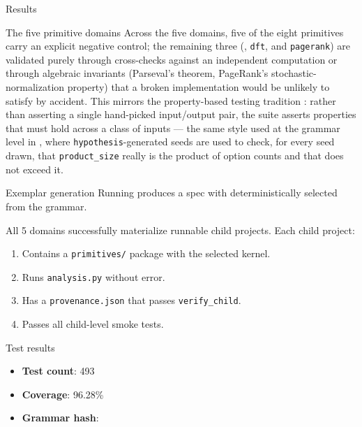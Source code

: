 \documentclass[
  ignorenonframetext,
]{beamer}
\providecommand{\tightlist}{%
  \setlength{\itemsep}{0pt}\setlength{\parskip}{0pt}}
\begin{document}
\begin{frame}{Results}
\begin{block}{The five primitive domains}
Across the five domains, five of the eight primitives carry an explicit
negative control; the remaining three (,
\texttt{dft}, and \texttt{pagerank}) are validated purely through
cross-checks against an independent computation or through algebraic
invariants (Parseval's theorem, PageRank's stochastic-normalization
property) that a broken implementation would be unlikely to satisfy by
accident. This mirrors the property-based testing tradition
: rather than
asserting a single hand-picked input/output pair, the suite asserts
properties that must hold across a class of inputs --- the same style
used at the grammar level in
, where
\texttt{hypothesis}-generated seeds are used to check, for every seed
drawn, that \texttt{product\_size} really is the product of option
counts and that  does not exceed it.
\end{block}

\begin{block}{Exemplar generation}
\protect{}\label{exemplar-generation}
Running
produces a spec with  deterministically
selected from the grammar.

All 5 domains successfully materialize runnable child projects. Each
child project:

\begin{enumerate}
\tightlist
\item
  Contains a \texttt{primitives/} package with the selected kernel.
\item
  Runs \texttt{analysis.py} without error.
\item
  Has a \texttt{provenance.json} that passes \texttt{verify\_child}.
\item
  Passes all child-level smoke tests.
\end{enumerate}
\end{block}

\begin{block}{Test results}
\protect{}\label{test-results}
\begin{itemize}
\tightlist
\item
  \textbf{Test count}: 493
\item
  \textbf{Coverage}: 96.28\%
\item
  \textbf{Grammar hash}: 
\end{itemize}


\end{block}
\end{frame}
\end{document}
